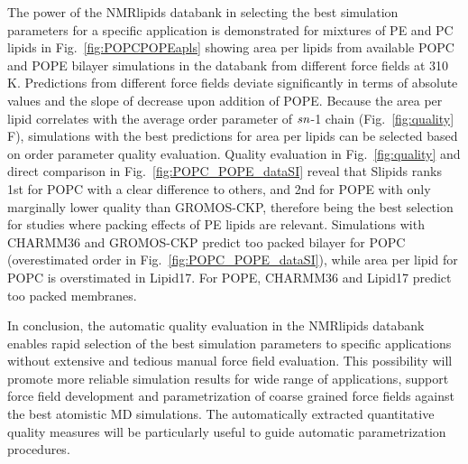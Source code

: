 \documentclass[fleqn,10pt]{wlscirep}
\begin{document}
The power of the NMRlipids databank in selecting the best simulation parameters for a specific application is demonstrated for mixtures of PE and PC lipids in Fig.~\ref{fig:POPCPOPEapls} showing area per lipids from available POPC and POPE bilayer simulations in the databank from different force fields at 310\,K. Predictions from different force fields deviate significantly in terms of absolute values and the slope of decrease upon addition of POPE. Because the area per lipid correlates with the average order parameter of $\it{sn}$-1 chain (Fig.~\ref{fig:quality} F), simulations with the best predictions for area per lipids can be selected based on order parameter quality evaluation. Quality evaluation in Fig.~\ref{fig:quality} and direct comparison in Fig.~\ref{fig:POPC_POPE_dataSI} reveal that Slipids ranks 1st for POPC with a clear difference to others, and 2nd for POPE with only marginally lower quality than GROMOS-CKP, therefore being the best selection for studies where packing effects of PE lipids are relevant. 
Simulations with CHARMM36 and GROMOS-CKP predict too packed bilayer for POPC (overestimated order in Fig.~\ref{fig:POPC_POPE_dataSI}), while area per lipid for POPC is overstimated in Lipid17. For POPE, 
CHARMM36 and Lipid17 predict too packed membranes. 


In conclusion, 
the automatic quality evaluation in the NMRlipids databank enables rapid selection of the best simulation parameters to specific applications without extensive and tedious manual force field evaluation. This possibility will promote more reliable simulation results for wide range of applications, support force field development and parametrization of coarse grained force fields against the best atomistic MD simulations. The automatically extracted quantitative quality measures will be particularly useful to guide automatic parametrization procedures.
\end{document}

